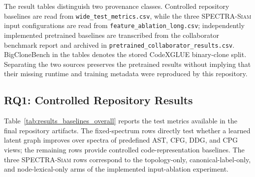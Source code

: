 \documentclass[authoryear,final,5p,times,twocolumn]{elsarticle}
\newcommand{\method}{\textsc{SPECTRA-Siam}}
\theoremstyle{plain}
\begin{document}
The result tables distinguish two provenance classes. Controlled repository
baselines are read from \texttt{wide\_test\_metrics.csv}, while the three
\method{} input configurations are read from
\texttt{feature\_ablation\_long.csv}; independently implemented
pretrained baselines are transcribed from the collaborator benchmark report and
archived in \texttt{pretrained\_collaborator\_results.csv}. BigCloneBench in
the tables denotes the stored CodeXGLUE binary-clone split. Separating the two
sources preserves the pretrained results without implying that their missing
runtime and training metadata were reproduced by this repository.

\subsection{RQ1: Controlled Repository Results}
\label{sec:rq}

Table~\ref{tab:results_baselines_overall} reports the test metrics available in
the final repository artifacts. The fixed-spectrum rows directly test whether a
learned latent graph improves over spectra of predefined AST, CFG, DDG, and CPG
views; the remaining rows provide controlled code-representation baselines. The
three \method{} rows correspond to the topology-only, canonical-label-only,
and node-lexical-only arms of the implemented input-ablation experiment.
\end{document}
